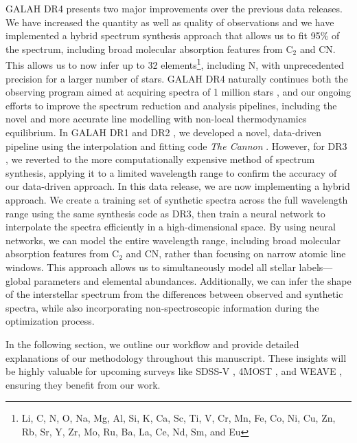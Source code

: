\documentclass[
  journal=pasa,
  manuscript=research-paper, %
  year=2024,
  volume=37
]{cup-journal}
\begin{document}
GALAH DR4 presents two major improvements over the previous data releases. We have increased the quantity as well as quality of observations and we have implemented a hybrid spectrum synthesis approach that allows us to fit 95\% of the spectrum, including broad molecular absorption features from $\mathrm{C_2}$ and CN. This allows us to now infer up to 32 elements\footnote{
Li, C, N, O, Na, Mg, Al, Si, K, Ca,
Sc, Ti, V, Cr, Mn, Fe, Co, Ni, Cu, Zn,
Rb, Sr, Y, Zr, Mo, Ru, Ba, La, Ce, Nd,
Sm, and Eu}, including N, with unprecedented precision for a larger number of stars. GALAH DR4 naturally continues both the observing program aimed at acquiring spectra of 1 million stars \citep{DeSilva2015}, and our ongoing efforts to improve the spectrum reduction and analysis pipelines, including the novel and more accurate line modelling with non-local thermodynamics equilibrium. In GALAH DR1 and DR2 \citep{Martell2017, Buder2018}, we developed a novel, data-driven pipeline using the interpolation and fitting code \textit{The Cannon} \citep{Ness2015}. However, for DR3 \citep{Buder2021}, we reverted to the more computationally expensive method of spectrum synthesis, applying it to a limited wavelength range to confirm the accuracy of our data-driven approach. In this data release, we are now implementing a hybrid approach. We create a training set of synthetic spectra across the full wavelength range using the same synthesis code as DR3, then train a neural network to interpolate the spectra efficiently in a high-dimensional space. By using neural networks, we can model the entire wavelength range, including broad molecular absorption features from $\mathrm{C_2}$ and CN, rather than focusing on narrow atomic line windows. This approach allows us to simultaneously model all stellar labels—global parameters and elemental abundances. Additionally, we can infer the shape of the interstellar spectrum from the differences between observed and synthetic spectra, while also incorporating non-spectroscopic information during the optimization process.

In the following section, we outline our workflow and provide detailed explanations of our methodology throughout this manuscript. These insights will be highly valuable for upcoming surveys like SDSS-V \citep{Kollmeier2017}, 4MOST \citep{4MOST2019}, and WEAVE \citep{Dalton2014}, ensuring they benefit from our work.
\end{document}
